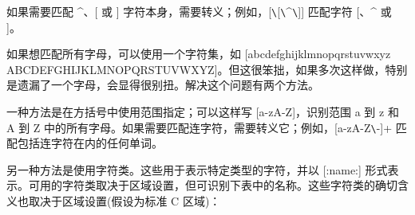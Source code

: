 如果需要匹配 \^{}、[ 或 ] 字符本身，需要转义；例如，[\verb|\|[\verb|\|\^{}\verb|\|]] 匹配字符 [、\^{} 或 ]。

如果想匹配所有字母，可以使用一个字符集，如 [abcdefghijklmnopqrstuvwxyz ABCDEFGHIJKLMNOPQRSTUVWXYZ]。但这很笨拙，如果多次这样做，特别是遗漏了一个字母，会显得很别扭。解决这个问题有两个方法。

一种方法是在方括号中使用范围指定；可以这样写 [a-zA-Z]，识别范围 a 到 z 和 A 到 Z 中的所有字母。如果需要匹配连字符，需要转义它；例如，[a-zA-Z\verb|\|-]+ 匹配包括连字符在内的任何单词。

另一种方法是使用字符类。这些用于表示特定类型的字符，并以 [:name:] 形式表示。可用的字符类取决于区域设置，但可识别下表中的名称。这些字符类的确切含义也取决于区域设置(假设为标准 C 区域)：


